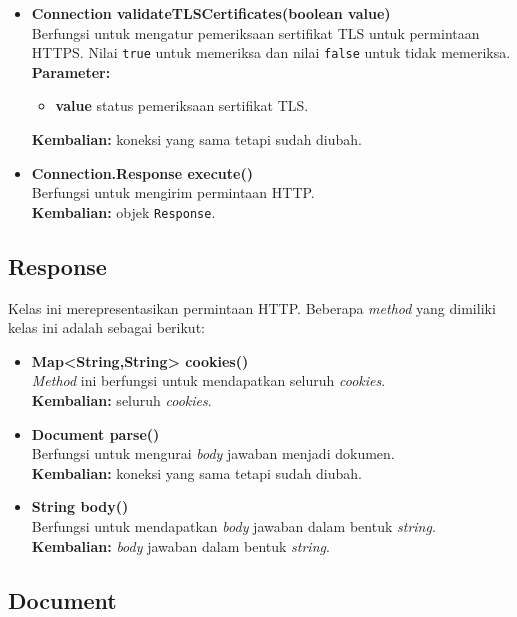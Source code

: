 \begin{itemize}
		\item \textbf{Connection validateTLSCertificates(boolean value)} \\
		Berfungsi untuk mengatur pemeriksaan sertifikat TLS untuk permintaan HTTPS. Nilai \texttt{true} untuk memeriksa dan nilai \texttt{false} untuk tidak memeriksa.\\
		\textbf{Parameter:}
		\begin{itemize}
			\item \textbf{value} status pemeriksaan sertifikat TLS.
		\end{itemize}
		\textbf{Kembalian:} koneksi yang sama tetapi sudah diubah.
		
		\item \textbf{Connection.Response execute()} \\
		Berfungsi untuk mengirim permintaan HTTP.\\
		\textbf{Kembalian:} objek \texttt{Response}.	
\end{itemize}

\subsection{Response}

Kelas ini merepresentasikan permintaan HTTP. Beberapa \textit{method} yang dimiliki kelas ini adalah sebagai berikut:
\begin{itemize}
	\item \textbf{Map<String,String> cookies()} \\
		\textit{Method} ini berfungsi untuk mendapatkan seluruh \textit{cookies}. \\
		\textbf{Kembalian:} seluruh \textit{cookies}.	
		
		\item \textbf{Document parse()} \\
		Berfungsi untuk mengurai \textit{body} jawaban menjadi dokumen. \\
		\textbf{Kembalian:} koneksi yang sama tetapi sudah diubah.
		
		\item \textbf{String body()} \\
		Berfungsi untuk mendapatkan \textit{body} jawaban dalam bentuk \textit{string}. \\
		\textbf{Kembalian:} \textit{body} jawaban dalam bentuk \textit{string}.
\end{itemize}

\subsection{Document}

